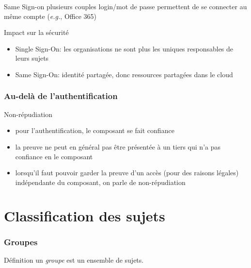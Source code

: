 \begin{reveals}
\begin{frame}
  \begin{block}{Same Sign-on}
    plusieurs couples login/mot de passe permettent de se connecter au
    même compte (\textit{e.g.}, Office 365)
  \end{block}

  \vfill
  \begin{block}{Impact sur la sécurité}
    \begin{itemize}
    \item Single Sign-On: les organisations ne sont plus les uniques
      responsables de leurs sujets
    \item Same Sign-On: identité partagée, donc ressources partagées
      dans le cloud
    \end{itemize}
  \end{block}

  \vfill
\end{frame}

\begin{frame}
  \frametitle{Au-delà de l'authentification}

  \vfill

  \begin{block}{Non-répudiation}
    \begin{itemize}
    \item pour l'authentification, le composant se fait confiance
    \item la preuve ne peut en général pas être présentée à un tiers
      qui n'a pas confiance en le composant
    \item lorsqu'il faut pouvoir garder la preuve d'un accès (pour des
      raisons légales) indépendante du composant, on parle de
      non-répudiation
    \end{itemize}
  \end{block}

  \vfill

\end{frame}

\section{Classification des sujets}

\begin{frame}
  \frametitle{Groupes}

  \vfill

  \begin{block}{Définition}
    un \emph{groupe} est un ensemble de sujets.
  \end{block}


\end{frame}
\end{reveals}
